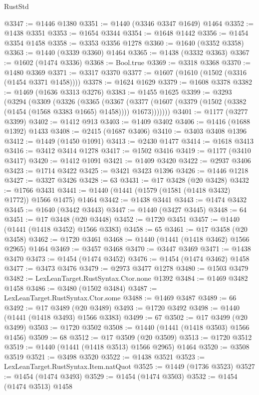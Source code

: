 \begin{lexlean}{RustStd}
\begin{coremodule}
@3347 := @1446 @1380
@3351 := @1440 (@3346 @3347 @1649) @1464
@3352 := @1438 @3351
@3353 := @1654 @3344
@3354 := @1648 @1442
@3356 := @1454 @3354 @1458
@3358 := @3353 @3356 @1278
@3360 := @1640 (@3352 @3358)
@3363 := @1440 (@3339 @3360) @1464
@3365 := @1438 (@3332 @3363)
@3367 := @1602 (@1474 @3336)
@3368 := Bool.true
@3369 := @3318 @3368
@3370 := @1480 @3369
@3371 := @3317 @3370
@3377 := @1607 (@1610 (@1502 (@3316 (@1454 @3371 @1458))))
@3378 := @1624 @1629
@3379 := @1608 @3378
@3382 := @1469 (@1636 @3313 @3276)
@3383 := @1455 @1625
@3399 := @3293
    (@3294
      (@3309
        (@3326
          (@3365
            (@3367
              (@3377 (@1607 (@3379 (@1502 (@3382 (@1454 (@1568 @3383 @1665) @1458)))) @1673)))))))
@3401 := @1177 (@3277 @3399)
@3402 := @1412 @913
@3403 := @1409 @3402
@3406 := @1416 (@1688 @1392) @1433
@3408 := @2415 (@1687 @3406)
@3410 := @3403 @3408 @1396
@3412 := @1449 (@1450 @1091)
@3413 := @2430 @1477
@3414 := @1618 @3413
@3416 := @3412 @3414 @1278
@3417 := @1502 @3416
@3419 := @1177 (@3410 @3417)
@3420 := @1412 @1091
@3421 := @1409 @3420
@3422 := @2937 @3406
@3423 := @1714 @3422
@3425 := @3421 @3423 @1396
@3426 := @1446 @1218
@3427 := @3327 @3426
@3428 := 63
@3431 := @17 @3428 (@20 @3428)
@3432 := @1766 @3431
@3441 := @1440 (@1441 (@1579 (@1581 (@1418 @3432) @1772)) @1566 @1475) @1464
@3442 := @1438 @3441
@3443 := @1474 @3432
@3445 := @1640 (@3442 @3443)
@3447 := @1440 (@3427 @3445)
@3448 := 64
@3451 := @17 @3448 (@20 @3448)
@3452 := @1720 @3451
@3457 := @1440 (@1441 (@1418 @3452) @1566 @3383)
@3458 := 65
@3461 := @17 @3458 (@20 @3458)
@3462 := @1720 @3461
@3468 := @1440 (@1441 (@1418 @3462) @1566 @2965) @1464
@3469 := @3457 @3468
@3470 := @3447 @3469
@3471 := @1438 @3470
@3473 := @1454 (@1474 @3452)
@3476 := @1454 (@1474 @3462) @1458
@3477 := @3473 @3476
@3479 := @2973 @3477 @1278
@3480 := @1503 @3479
@3482 := LexLeanTarget.RustSyntax.Ctor.none @1392
@3484 := @1469 @3482 @1458
@3486 := @3480 (@1502 @3484)
@3487 := LexLeanTarget.RustSyntax.Ctor.some
@3488 := @1469 @3487
@3489 := 66
@3492 := @17 @3489 (@20 @3489)
@3493 := @1720 @3492
@3498 := @1440 (@1441 (@1418 @3493) @1566 @3383)
@3499 := 67
@3502 := @17 @3499 (@20 @3499)
@3503 := @1720 @3502
@3508 := @1440 (@1441 (@1418 @3503) @1566 @1456)
@3509 := 68
@3512 := @17 @3509 (@20 @3509)
@3513 := @1720 @3512
@3519 := @1440 (@1441 (@1418 @3513) @1566 @2965) @1464
@3520 := @3508 @3519
@3521 := @3498 @3520
@3522 := @1438 @3521
@3523 := LexLeanTarget.RustSyntax.Item.natQuot
@3525 := @1449 (@1736 @3523)
@3527 := @1454 (@1474 @3493)
@3529 := @1454 (@1474 @3503)
@3532 := @1454 (@1474 @3513) @1458

\end{coremodule}
\end{lexlean}

